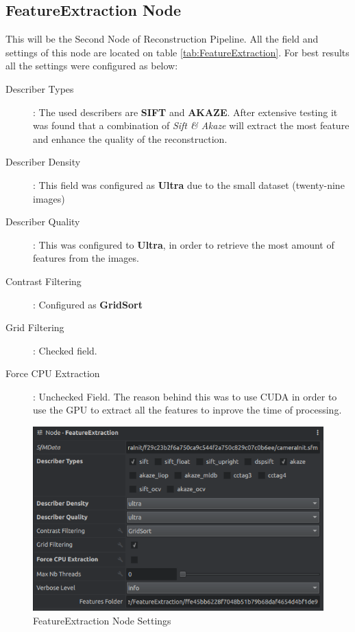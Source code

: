 \documentclass[12pt]{report}
\begin{document}
\subsection*{FeatureExtraction Node}
This will be the Second Node of Reconstruction Pipeline. All the field and settings of this node are located on table \ref{tab:FeatureExtraction}.
For best results all the settings were configured as below:

\begin{description}
  \item[Describer Types]: The used describers are \textbf{SIFT} and \textbf{AKAZE}. After extensive testing it was found that a combination of \textit{Sift \& Akaze} will extract the most feature and enhance the quality of the reconstruction.
  \item[Describer Density] : This field was configured as \textbf{Ultra} due to the small dataset (twenty-nine images)
  \item[Describer Quality] : This was configured to \textbf{Ultra}, in order to retrieve the most amount of features from the images.
  \item[Contrast Filtering]: Configured as \textbf{GridSort}
  \item[Grid Filtering]  : Checked field.
  \item[Force CPU Extraction] : Unchecked Field. The reason behind this was to use CUDA in order to use the GPU to extract all the features to inprove the time of processing.
\end{description}


\begin{figure}[H]%
  \centering
 \includegraphics[width=1\textwidth]{FeatureExtractionNode.png}
\caption{FeatureExtraction Node Settings}
\label{fig:feature_extraction_node} 
\end{figure}
\end{document}
